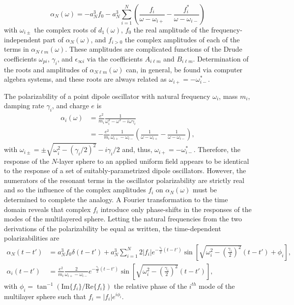 \documentclass{article}
\begin{document}
\begin{equation}
\alpha_N(\omega) = -a_N^3f_0 - a_N^3\sum_{i=1}^N\left(\frac{f_i}{\omega - \omega_{i+}} - \frac{f_i^*}{\omega - \omega_{i-}}\right)
\end{equation}
with $\omega_{i\pm}$ the complex roots of $d_1(\omega)$, $f_0$ the real amplitude of the frequency-independent part of $\alpha_N(\omega)$, and $f_{i>0}$ the complex amplitudes of each of the terms in $\alpha_{N\ell m}(\omega)$. These amplitudes are complicated functions of the Drude coefficients $\omega_{pi}$, $\gamma_i$, and $\epsilon_{\infty i}$ via the coefficients $A_{i\ell m}$ and $B_{i\ell m}$. Determination of the roots and amplitudes of $\alpha_{N\ell m}(\omega)$ can, in general, be found via computer algebra systems, and these roots are always related as $\omega_{i+} = -\omega_{i-}^*$. 

The polarizability of a point dipole oscillator with natural frequency $\omega_i$, mass $m_i$, damping rate $\gamma_i$, and charge $e$ is
\begin{equation}
\begin{split}
\alpha_i(\omega) &= \frac{e^2}{m_i}\frac{1}{\omega_i^2 - \omega^2 - i\omega\gamma_i}\\
&= -\frac{e^2}{m_i}\frac{1}{\omega_{i+}-\omega_{i-}}\left(\frac{1}{\omega - \omega_{i+}} - \frac{1}{\omega - \omega_{i-}}\right),
\end{split}
\end{equation}
with $\omega_{i\pm} = \pm\sqrt{\omega_i^2 - (\gamma_i/2)^2} - i\gamma_i/2$ and, thus, $\omega_{i+} = -\omega_{i-}^*$. Therefore, the response of the $N$-layer sphere to an applied uniform field appears to be identical to the response of a set of suitably-parametrized dipole oscillators. However, the numerators of the resonant terms in the oscillator polarizability are strictly real and so the influence of the complex amplitudes $f_i$ on $\alpha_N(\omega)$ must be determined to complete the analogy. A Fourier transformation to the time domain reveals that complex $f_i$ introduce only phase-shifts in the responses of the modes of the multilayered sphere. Letting the natural frequencies from the two derivations of the polarizability be equal as written, the time-dependent polarizabilities are
\begin{equation}
\begin{split}
\alpha_N(t-t') &= a_N^3f_0\delta(t - t') + a_N^3\sum_{i=1}^N 2|f_i|e^{-\frac{\gamma_i}{2}(t-t')}\sin\left[\sqrt{\omega_i^2 - \left(\frac{\gamma_i}{2}\right)^2}(t - t')+ \phi_i\right],\\
\alpha_i(t-t') &= \frac{e^2}{m_i}\frac{2}{\omega_{i+} - \omega_{i-}}e^{-\frac{\gamma_i}{2}(t-t')}\sin\left[\sqrt{\omega_i^2 - \left(\frac{\gamma_i}{2}\right)^2}(t-t')\right],
\end{split}
\end{equation}
with $\phi_i = \tan^{-1}(\text{Im}\{f_i\}/\text{Re}\{f_i\})$ the relative phase of the $i^{th}$ mode of the multilayer sphere such that $f_i = |f_i|e^{i\phi_i}$. 
\end{document}
